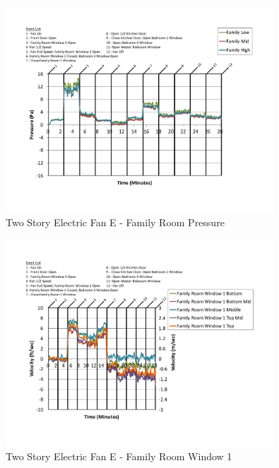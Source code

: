 \documentclass{article}
\begin{document}
\begin{appendices}
	\begin{figure}[H]
		\centering
		\includegraphics[height=3.05in,trim=0.67in 1.1in 0.67in 0.8in,clip=true]{0_Images/Results_Charts/ColdFlow/Two_Story/Electric/E/Family_Room_Pressure.pdf}
		\caption{Two Story Electric Fan E - Family Room Pressure}
	\end{figure}
 

	\begin{figure}[H]
		\centering
		\includegraphics[height=3.05in,trim=0.67in 1.1in 0.67in 0.8in,clip=true]{0_Images/Results_Charts/ColdFlow/Two_Story/Electric/E/Family_Room_Window_1.pdf}
		\caption{Two Story Electric Fan E - Family Room Window 1}
	\end{figure}
 
	\clearpage


\end{appendices}
\end{document}
